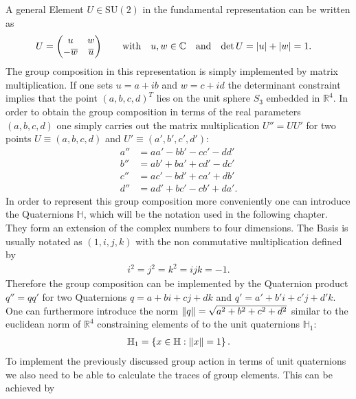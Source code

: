 A general Element $U \in \mathrm{SU}(2)$ in the fundamental representation can be written as
\begin{align}
 U & =
 \begin{pmatrix}
  u             & w            \\
  -\overline{w} & \overline{u}
 \end{pmatrix} \qquad \textrm{with} \quad u,w \in \mathbb{C} \quad \textrm{and} \quad \mathrm{det} \, U = \abs{u} + \abs{w} = 1 \textrm{.}
 \label{eq:generalSu2Element}
\end{align}
The group composition in this representation is simply implemented by matrix multiplication. If one sets $u = a + ib$ and $w = c + id$ the determinant constraint implies that the point $(a,b,c,d)^T$ lies on the unit sphere $S_3$ embedded in $\mathbb{R}^4$. In order to obtain the group composition in terms of the real parameters $(a,b,c,d)$ one simply carries out the matrix multiplication $U'' = U U'$ for two points $U \equiv (a,b,c,d)$ and $U' \equiv (a',b',c',d')$:
\begin{align*}
 a'' & = a a' - b b' - c c' - d d'            \\
 b'' & = a b' + b a' + c d' - d c'            \\
 c'' & = a c' - b d' + c a' + d b'            \\
 d'' & = a d' + b c' - c b' + d a' \textrm{.}
\end{align*}
In order to represent this group composition more conveniently one can introduce the Quaternions $\mathbb{H}$, which will be the notation used in the following chapter. They form an extension of the complex numbers to four dimensions. The Basis is usually notated as $(1,i,j,k)$ with the non commutative multiplication defined by
\begin{align*}
 i^2 = j^2 = k^2 = ijk = -1 \textrm{.}
\end{align*}
Therefore the group composition can be implemented by the Quaternion product $q'' = q q'$ for two Quaternions $q = a + bi + cj + dk$ and $q' = a' + b'i + c'j + d'k$. One can furthermore introduce the norm $\norm{q} = \sqrt{a^2 + b^2 + c^2 +d^2}$ similar to the euclidean norm of $\mathbb{R}^4$ constraining elements of \SUTwo to the unit quaternions $\mathbb{H}_1$:
\begin{align*}
 \mathbb{H}_1 = \left\{ x \in \mathbb{H} : \norm{x} = 1\right\} \textrm{.}
\end{align*}
To implement the previously discussed group action in terms of unit quaternions we also need to be able to calculate the traces of group elements. This can be achieved by
